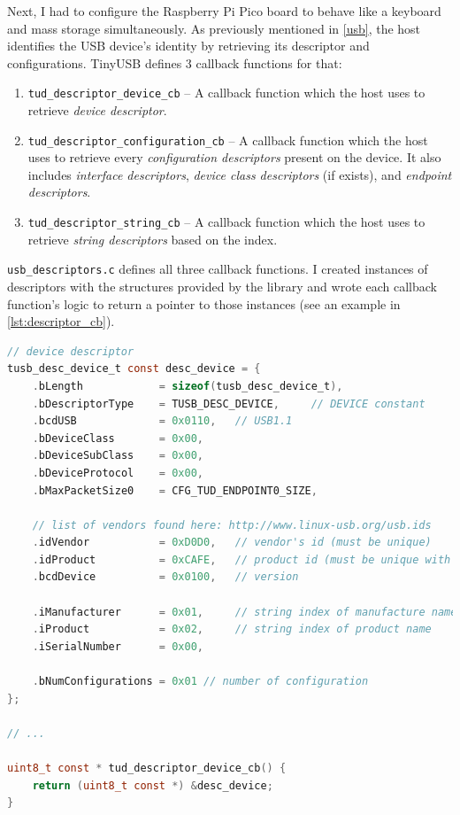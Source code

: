 Next, I had to configure the Raspberry Pi Pico board to behave like a keyboard and mass storage simultaneously. As previously mentioned in \autoref{usb}, the host identifies the USB device's identity by retrieving its descriptor and configurations. TinyUSB defines 3 callback functions for that:
\begin{enumerate}
    \item \verb|tud_descriptor_device_cb| -- A callback function which the host uses to retrieve \emph{device descriptor}.
    \item \verb|tud_descriptor_configuration_cb| -- A callback function which the host uses to retrieve every \emph{configuration descriptors} present on the device. It also includes \emph{interface descriptors}, \emph{device class descriptors} (if exists), and \emph{endpoint descriptors}.
    \item \verb|tud_descriptor_string_cb| -- A callback function which the host uses to retrieve \emph{string descriptors} based on the index.
\end{enumerate}

\verb|usb_descriptors.c| defines all three callback functions. I created instances of descriptors with the structures provided by the library and wrote each callback function's logic to return a pointer to those instances (see an example in \autoref{lst:descriptor_cb}).

\begin{lstlisting}[caption={Definition of the \emph{device descriptor} and its callback function used in \texttt{usb\_descriptors.c}.},
                   label={lst:descriptor_cb},
                   language=c]
// device descriptor
tusb_desc_device_t const desc_device = {
    .bLength            = sizeof(tusb_desc_device_t),
    .bDescriptorType    = TUSB_DESC_DEVICE,     // DEVICE constant
    .bcdUSB             = 0x0110,   // USB1.1
    .bDeviceClass       = 0x00,
    .bDeviceSubClass    = 0x00,
    .bDeviceProtocol    = 0x00,
    .bMaxPacketSize0    = CFG_TUD_ENDPOINT0_SIZE,

    // list of vendors found here: http://www.linux-usb.org/usb.ids
    .idVendor           = 0xD0D0,   // vendor's id (must be unique)
    .idProduct          = 0xCAFE,   // product id (must be unique with vendor)
    .bcdDevice          = 0x0100,   // version

    .iManufacturer      = 0x01,     // string index of manufacture name
    .iProduct           = 0x02,     // string index of product name
    .iSerialNumber      = 0x00,

    .bNumConfigurations = 0x01 // number of configuration
};

// ...

uint8_t const * tud_descriptor_device_cb() {
    return (uint8_t const *) &desc_device;
}
\end{lstlisting}

